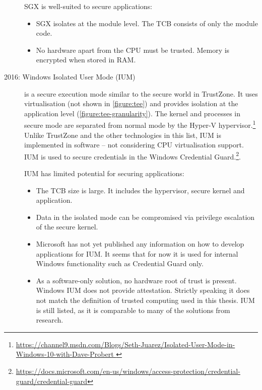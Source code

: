 \begin{description}
SGX is well-suited to secure applications:\label{ID_98041302}
\begin{itemize}\label{ID_1198060032}
\item SGX isolates at the module level. The TCB consists of only the module code.\label{ID_1985518136}
\item No hardware apart from the CPU must be trusted. Memory is encrypted when stored in RAM.\label{ID_784477812}
\end{itemize}\label{ID_976583741}
\item[2016: Windows Isolated User Mode (IUM)\footnotemark]\label{ID_475389692}
\label{ID_116366543}
is a secure execution mode similar to the secure world in TrustZone.\label{ID_1711941438}
It uses virtualisation (not shown in \autoref{figure:tee}) and provides isolation at the application level (\autoref{figure:tee-granularity}).\label{ID_935453675}
The kernel and processes in secure mode are separated from normal mode by the Hyper-V hypervisor.\footnote{\url{https://channel9.msdn.com/Blogs/Seth-Juarez/Isolated-User-Mode-in-Windows-10-with-Dave-Probert }}\label{ID_1602001478}
Unlike TrustZone and the other technologies in this list, IUM is implemented in software -- not considering CPU virtualisation support.\label{ID_1070749392}
IUM is used to secure credentials in the Windows Credential Guard.\footnote{\url{https://docs.microsoft.com/en-us/windows/access-protection/credential-guard/credential-guard}}.\label{ID_1423103777}

IUM has limited potential for securing applications:\label{ID_642451187}
\begin{itemize}\label{ID_214143695}
\item The TCB size is large. It includes the hypervisor, secure kernel and application.\label{ID_239128518}
\item Data in the isolated mode can be compromised via privilege escalation of the secure kernel.\label{ID_1471146382}
\item Microsoft has not yet published any information on how to develop applications for IUM. It seems that for now it is used for internal Windows functionality such as Credential Guard only.\label{ID_1314168201}
\item As a software-only solution, no hardware root of trust is present. Windows IUM does not provide attestation. Strictly speaking it does not match the definition of trusted computing used in this thesis. IUM is still listed, as it is comparable to many of the solutions from research.\label{ID_1504627143}
\end{itemize}\label{ID_1993992542}
\end{description}\label{ID_412101102}


